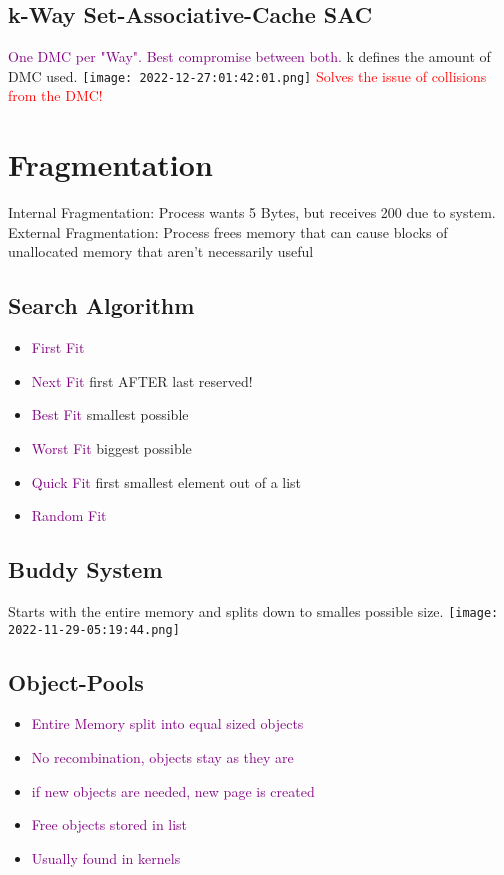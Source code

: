 \documentclass[main.tex,fontsize=8pt,paper=a4,paper=landscape,DIV=calc,]{scrartcl}
\begin{document}
\begin{multicols*}{4}
\subsection{k-Way Set-Associative-Cache SAC}
\textcolor{purple}{One DMC per "Way". Best compromise between both.}\newline
k defines the amount of DMC used. 
\texttt{[image: 2022-12-27:01:42:01.png]} 
\textcolor{red}{Solves the issue of collisions from the DMC!}

\section{Fragmentation}
\textcolor{OliveGreen}{Internal Fragmentation:} Process wants 5 Bytes, but receives 200 due to system. \newline
\textcolor{OliveGreen}{External Fragmentation:} Process frees memory that can cause blocks of unallocated memory that aren't necessarily useful

\subsection{Search Algorithm}
\begin{itemize}
\item \textcolor{purple}{First Fit}
\item \textcolor{purple}{Next Fit} first AFTER last reserved!
\item \textcolor{purple}{Best Fit} smallest possible
\item \textcolor{purple}{Worst Fit} biggest possible
\item \textcolor{purple}{Quick Fit} \newline
  first smallest element out of a list
\item \textcolor{purple}{Random Fit}
\end{itemize} 

\subsection{Buddy System}
Starts with the entire memory and splits down to smalles possible size.\newline
\texttt{[image: 2022-11-29-05:19:44.png]}

\subsection{Object-Pools}
\begin{itemize}
\item \textcolor{purple}{Entire Memory split into equal sized objects}
\item \textcolor{purple}{No recombination, objects stay as they are}
\item \textcolor{purple}{if new objects are needed, new page is created}
\item \textcolor{purple}{Free objects stored in list}
\item \textcolor{purple}{Usually found in kernels}
\end{itemize} 


\end{multicols*}
\end{document}

